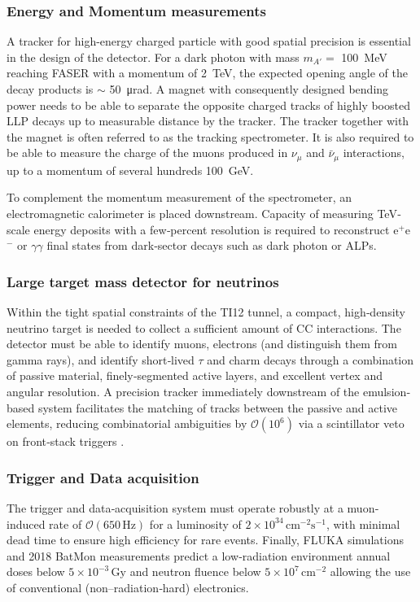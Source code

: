 		\subsubsection{Energy and Momentum measurements}
		A tracker for high-energy charged particle with good spatial precision is essential in the design of the detector. For a dark photon with mass $m_{A'} =$ \SI{100}{\mega\electronvolt} reaching FASER with a momentum of \SI{2}{\tera\electronvolt}, the expected opening angle of the decay products is $\sim $ \SI{50}{\micro\radian}. A magnet with consequently designed bending power needs to be able to separate the opposite charged tracks of highly boosted LLP decays up to measurable distance by the tracker. The tracker together with the magnet is often referred to as the tracking spectrometer. It is also required to be able to measure the charge of the muons produced in $\nu_{\mu}$ and $\bar{\nu}_{\mu}$ interactions, up to a momentum of several hundreds \SI{100}{\giga\electronvolt}.
		
		To complement the momentum measurement of the spectrometer, an electromagnetic calorimeter is placed downstream. Capacity of measuring TeV‐scale energy deposits with a few‐percent resolution is required to reconstruct e\(^{+}\)e\(^{-}\) or \(\gamma\gamma\) final states from dark‐sector decays such as dark photon or ALPs.
		
		\subsubsection{Large target mass detector for neutrinos}
		Within the tight spatial constraints of the TI12 tunnel, a compact, high‐density neutrino target is needed to collect a sufficient amount of CC interactions. The detector must be able to identify muons, electrons (and distinguish them from gamma rays), and identify short‐lived \(\tau\) and charm decays through a combination of passive material, finely‐segmented active layers, and excellent vertex and angular resolution.  A precision tracker immediately downstream of the emulsion‐based system facilitates the matching of tracks between the passive and active elements, reducing combinatorial ambiguities by $\mathcal{O}(10^{6})$ via a scintillator veto on front‐stack triggers \cite{FASER_Detector}.
		
		
		\subsubsection{Trigger and Data acquisition}
		The trigger and data‐acquisition system must operate robustly at a muon‐induced rate of $\mathcal{O}(650\,\mathrm{Hz})$ for a luminosity of $2\times10^{34}\,\mathrm{cm}^{-2}\mathrm{s}^{-1}$, with minimal dead time to ensure high efficiency for rare events. Finally, FLUKA simulations and 2018 BatMon measurements predict a low‐radiation environment annual doses below $5\times10^{-3}\,\mathrm{Gy}$ and neutron fluence below $5\times10^{7}\,\mathrm{cm}^{-2}$ allowing the use of conventional (non–radiation‐hard) electronics.
 

